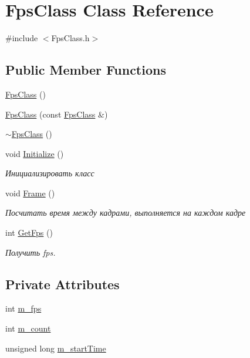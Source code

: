 \hypertarget{class_fps_class}{}\section{Fps\+Class Class Reference}
\label{class_fps_class}


{\ttfamily \#include $<$Fps\+Class.\+h$>$}

\subsection*{Public Member Functions}
\begin{DoxyCompactItemize}
\item 
\hyperlink{class_fps_class_a5e9ace7473f055321c370acd8a02c2c6}{Fps\+Class} ()
\item 
\hyperlink{class_fps_class_a94b260cc3be5193330eecd6cee2d2092}{Fps\+Class} (const \hyperlink{class_fps_class}{Fps\+Class} \&)
\item 
\hyperlink{class_fps_class_a63fd2ecc65220fe7231e69be005b47e8}{$\sim$\+Fps\+Class} ()
\item 
void \hyperlink{class_fps_class_a75f15b746a2a62cd7afc5d54a7f9d8f9}{Initialize} ()
\begin{DoxyCompactList}\small\item\em Инициализировать класс \end{DoxyCompactList}\item 
void \hyperlink{class_fps_class_aea9716ad6375377f04d75ae412953129}{Frame} ()
\begin{DoxyCompactList}\small\item\em Посчитать время между кадрами, выполняется на каждом кадре \end{DoxyCompactList}\item 
int \hyperlink{class_fps_class_a664b6d19e6b5270db79597d32acb3a03}{Get\+Fps} ()
\begin{DoxyCompactList}\small\item\em Получить fps. \end{DoxyCompactList}\end{DoxyCompactItemize}
\subsection*{Private Attributes}
\begin{DoxyCompactItemize}
\item 
int \hyperlink{class_fps_class_aefa78e89d06e60bd61de47885e942270}{m\+\_\+fps}
\item 
int \hyperlink{class_fps_class_ad567650f12c7fffef65550ee2d59b5df}{m\+\_\+count}
\item 
unsigned long \hyperlink{class_fps_class_a3a5d1c366d4bb51d1867dd41cee38fb4}{m\+\_\+start\+Time}
\end{DoxyCompactItemize}


